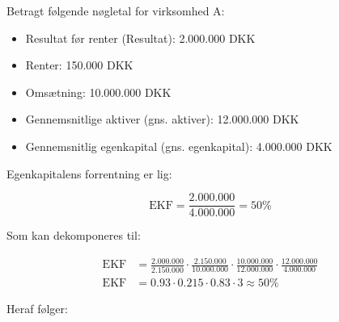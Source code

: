 \documentclass[10pt,reqno, usenames]{article}
\begin{document}
\begin{tcolorbox}[colback=red!5!white, colframe=red!50!black, title= Eksempel af EKF dekomponering, breakable]
Betragt følgende nøgletal for virksomhed A: 

\begin{itemize}
    \item Resultat før renter (Resultat): 2.000.000 DKK
    \item Renter: 150.000 DKK
    \item Omsætning: 10.000.000 DKK 
    \item Gennemsnitlige aktiver (gns. aktiver): 12.000.000 DKK
    \item Gennemsnitlig egenkapital (gns. egenkapital): 4.000.000 DKK
\end{itemize}

Egenkapitalens forrentning er lig: 

\begin{equation}
    \text{EKF} = \frac{2.000.000}{4.000.000} = 50 \% \nonumber
\end{equation}

Som kan dekomponeres til: 

\begin{align}
    \text{EKF} & = \frac{2.000.000}{2.150.000} \cdot \frac{2.150.000}{10.000.000} \cdot \frac{10.000.000}{12.000.000} \cdot \frac{12.000.000}{4.000.000} \\
    \text{EKF} & = 0.93 \cdot 0.215 \cdot 0.83 \cdot 3 \approx 50 \% \nonumber
\end{align}

Heraf følger: 


\end{tcolorbox}
\end{document}
